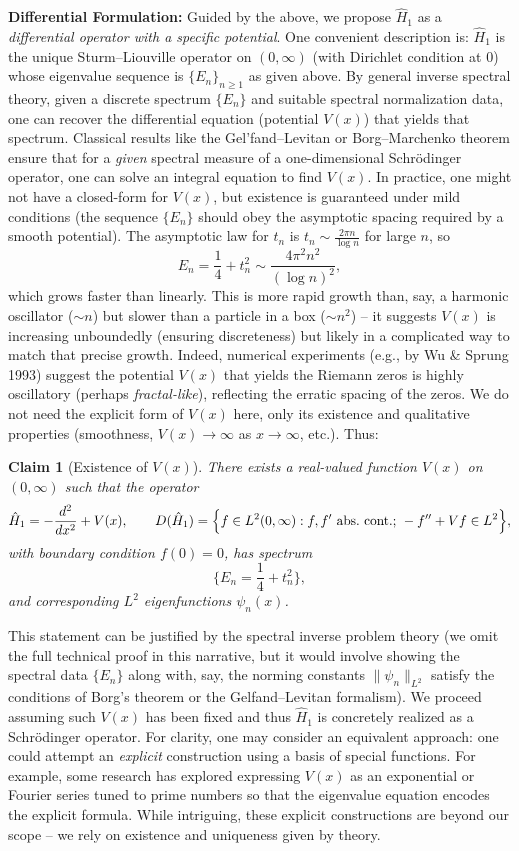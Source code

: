\documentclass[12pt]{article}
\theoremstyle{plain}
\newtheorem{claim}[theorem]{Claim}
\theoremstyle{definition}
\begin{document}
\textbf{Differential Formulation:} Guided by the above, we propose \(\hat{H}_1\) as a \emph{differential operator with a specific potential}. One convenient description is: \(\hat{H}_1\) is the unique Sturm--Liouville operator on \((0,\infty)\) (with Dirichlet condition at 0) whose eigenvalue sequence is \(\{E_n\}_{n\ge1}\) as given above. By general inverse spectral theory, given a discrete spectrum \(\{E_n\}\) and suitable spectral normalization data, one can recover the differential equation (potential \(V(x)\)) that yields that spectrum. Classical results like the Gel'fand--Levitan or Borg--Marchenko theorem ensure that for a \emph{given} spectral measure of a one-dimensional Schr\"odinger operator, one can solve an integral equation to find \(V(x)\). In practice, one might not have a closed-form for \(V(x)\), but existence is guaranteed under mild conditions (the sequence \(\{E_n\}\) should obey the asymptotic spacing required by a smooth potential). The asymptotic law for \(t_n\) is \(t_n \sim \frac{2\pi n}{\log n}\) for large \(n\), so 
\[
E_n = \frac{1}{4} + t_n^2 \sim \frac{4\pi^2 n^2}{(\log n)^2},
\]
which grows faster than linearly. This is more rapid growth than, say, a harmonic oscillator (\(\sim n\)) but slower than a particle in a box (\(\sim n^2\)) -- it suggests \(V(x)\) is increasing unboundedly (ensuring discreteness) but likely in a complicated way to match that precise growth. Indeed, numerical experiments (e.g., by Wu \& Sprung 1993) suggest the potential \(V(x)\) that yields the Riemann zeros is highly oscillatory (perhaps \emph{fractal-like}), reflecting the erratic spacing of the zeros. We do not need the explicit form of \(V(x)\) here, only its existence and qualitative properties (smoothness, \(V(x)\to\infty\) as \(x\to\infty\), etc.). Thus:

\begin{claim}[Existence of \(V(x)\)]
There exists a real-valued function \(V(x)\) on \((0,\infty)\) such that the operator
\[
\hat{H}_1 = -\frac{d^2}{dx^2} + V(x), \qquad D(\hat{H}_1) = \Bigl\{f\in L^2(0,\infty): f, f' \text{ abs.\ cont.; } -f''+Vf \in L^2\Bigr\},
\]
with boundary condition \(f(0)=0\), has spectrum
\[
\{E_n = \frac{1}{4} + t_n^2\},
\]
and corresponding \(L^2\) eigenfunctions \(\psi_n(x)\).
\end{claim}

This statement can be justified by the spectral inverse problem theory (we omit the full technical proof in this narrative, but it would involve showing the spectral data \(\{E_n\}\) along with, say, the norming constants \(\|\psi_n\|_{L^2}\) satisfy the conditions of Borg's theorem or the Gelfand--Levitan formalism). We proceed assuming such \(V(x)\) has been fixed and thus \(\hat{H}_1\) is concretely realized as a Schr\"odinger operator. For clarity, one may consider an equivalent approach: one could attempt an \emph{explicit} construction using a basis of special functions. For example, some research has explored expressing \(V(x)\) as an exponential or Fourier series tuned to prime numbers so that the eigenvalue equation encodes the explicit formula. While intriguing, these explicit constructions are beyond our scope -- we rely on existence and uniqueness given by theory.
\end{document}
